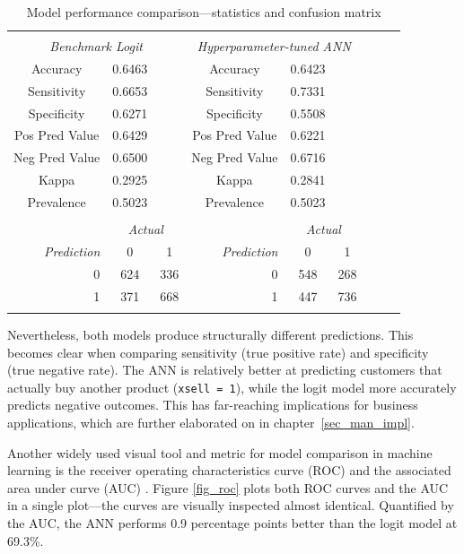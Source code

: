 \documentclass[12pt,a4paper]{article}
\let\code=\texttt
\begin{document}
\begin{table}[!htbp] \centering
\caption{Model performance comparison---statistics and confusion matrix}
\label{tab_comparemodel} 
{\small
\begin{tabular}{@{\extracolsep{5pt}} ccccccccc} 
\\[-1.8ex]\hline 
\hline \\[-1.8ex] 
\multicolumn{3}{c}{\textit{Benchmark Logit}} & \multicolumn{3}{c}{\textit{Hyperparameter-tuned ANN}} \\ \hline
Accuracy & 0.6463 &  & Accuracy & 0.6423 &  \\
Sensitivity & 0.6653 &  & Sensitivity & 0.7331 &  \\
Specificity & 0.6271 &  & Specificity & 0.5508 &  \\
Pos Pred Value & 0.6429 &  & Pos Pred Value & 0.6221 &  \\
Neg Pred Value & 0.6500 &  & Neg Pred Value & 0.6716 &  \\
Kappa & 0.2925 &  & Kappa & 0.2841 &  \\
Prevalence & 0.5023 &  & Prevalence & 0.5023 &  \\
\hline \\[-1.8ex] 
 & \multicolumn{2}{c}{\textit{Actual}} &  & \multicolumn{2}{c}{\textit{Actual}} \\
\multicolumn{1}{r}{\textit{Prediction}} & 0 & \multicolumn{1}{c}{1} & \multicolumn{1}{r}{\textit{Prediction}} & 0 & \multicolumn{1}{c}{1} \\ 
\multicolumn{1}{r}{0} & 624 & \multicolumn{1}{c}{336} & \multicolumn{1}{r}{0} & 548 & \multicolumn{1}{c}{268} \\
\multicolumn{1}{r}{1} & 371 & \multicolumn{1}{c}{668} & \multicolumn{1}{r}{1} & 447 & \multicolumn{1}{c}{736} \\
\hline \\[-1.8ex] 
\end{tabular}
}
\end{table}
Nevertheless, both models produce structurally different predictions.
This becomes clear when comparing sensitivity (true positive rate) and specificity (true negative rate).
The ANN is relatively better at predicting customers that actually buy another product (\code{xsell = 1}),
while the logit model more accurately predicts negative outcomes.
This has far-reaching implications for business applications, which are further elaborated on in chapter~\ref{sec_man_impl}.

Another widely used visual tool and metric for model comparison in machine learning is the receiver operating characteristics curve (ROC) and the associated
area under curve (AUC) \citep{fawcettIntroductionROCAnalysis2006}.
Figure \ref{fig_roc} plots both ROC curves and the AUC in a single plot---the curves are visually inspected almost identical.
Quantified by the AUC, the ANN performs 0.9 percentage points better than the logit model at 69.3\%.
\end{document}
